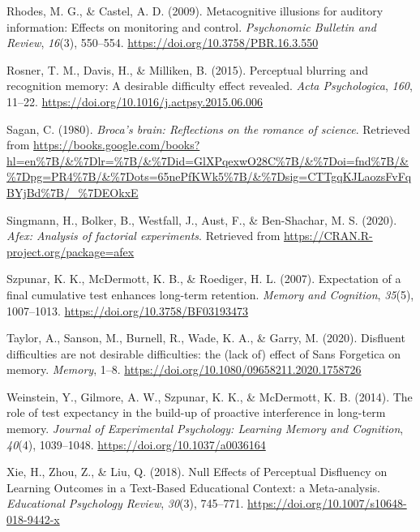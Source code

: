 \documentclass[
  english,
  jou]{apa6}
\begin{document}
\leavevmode\hypertarget{ref-Rhodes2009}{}%
Rhodes, M. G., \& Castel, A. D. (2009). Metacognitive illusions for auditory information: Effects on monitoring and control. \emph{Psychonomic Bulletin and Review}, \emph{16}(3), 550--554. \url{https://doi.org/10.3758/PBR.16.3.550}

\leavevmode\hypertarget{ref-Rosner2015}{}%
Rosner, T. M., Davis, H., \& Milliken, B. (2015). Perceptual blurring and recognition memory: A desirable difficulty effect revealed. \emph{Acta Psychologica}, \emph{160}, 11--22. \url{https://doi.org/10.1016/j.actpsy.2015.06.006}

\leavevmode\hypertarget{ref-Sagan1980}{}%
Sagan, C. (1980). \emph{Broca's brain: Reflections on the romance of science}. Retrieved from \url{https://books.google.com/books?hl=en\%7B/\&\%7Dlr=\%7B/\&\%7Did=GlXPqexwO28C\%7B/\&\%7Doi=fnd\%7B/\&\%7Dpg=PR4\%7B/\&\%7Dots=65nePfKWk5\%7B/\&\%7Dsig=CTTgqKJLaozsFvFqBYjBd\%7B/_\%7DEOkxE}

\leavevmode\hypertarget{ref-Singmann2020}{}%
Singmann, H., Bolker, B., Westfall, J., Aust, F., \& Ben-Shachar, M. S. (2020). \emph{Afex: Analysis of factorial experiments}. Retrieved from \url{https://CRAN.R-project.org/package=afex}

\leavevmode\hypertarget{ref-Szpunar2007}{}%
Szpunar, K. K., McDermott, K. B., \& Roediger, H. L. (2007). Expectation of a final cumulative test enhances long-term retention. \emph{Memory and Cognition}, \emph{35}(5), 1007--1013. \url{https://doi.org/10.3758/BF03193473}

\leavevmode\hypertarget{ref-Taylor2020}{}%
Taylor, A., Sanson, M., Burnell, R., Wade, K. A., \& Garry, M. (2020). Disfluent difficulties are not desirable difficulties: the (lack of) effect of Sans Forgetica on memory. \emph{Memory}, 1--8. \url{https://doi.org/10.1080/09658211.2020.1758726}

\leavevmode\hypertarget{ref-Weinstein2014}{}%
Weinstein, Y., Gilmore, A. W., Szpunar, K. K., \& McDermott, K. B. (2014). The role of test expectancy in the build-up of proactive interference in long-term memory. \emph{Journal of Experimental Psychology: Learning Memory and Cognition}, \emph{40}(4), 1039--1048. \url{https://doi.org/10.1037/a0036164}

\leavevmode\hypertarget{ref-Xie2018}{}%
Xie, H., Zhou, Z., \& Liu, Q. (2018). Null Effects of Perceptual Disfluency on Learning Outcomes in a Text-Based Educational Context: a Meta-analysis. \emph{Educational Psychology Review}, \emph{30}(3), 745--771. \url{https://doi.org/10.1007/s10648-018-9442-x}

\endgroup
\end{document}
